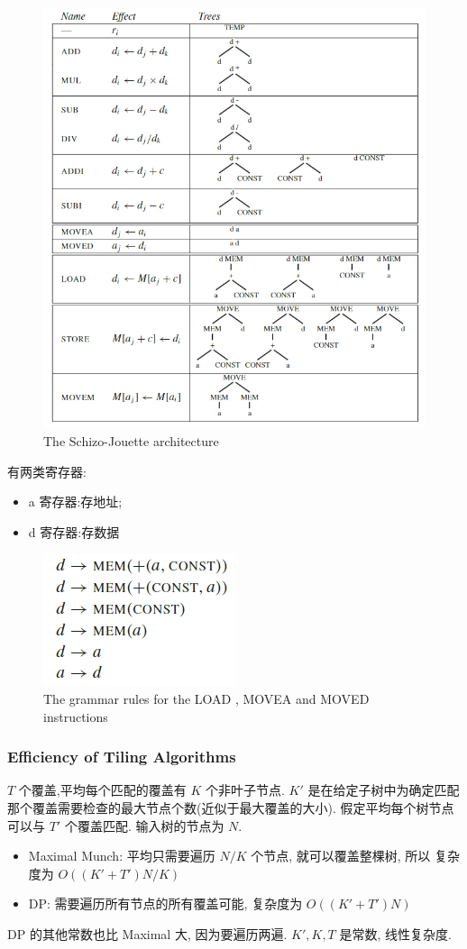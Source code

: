 \begin{figure}[H]
    \centering
    \includegraphics[width=0.94\linewidth]{pic/CP9/The Schizo-Jouette architecture}
    \caption{The Schizo-Jouette architecture}
\end{figure}


有两类寄存器:
\begin{itemize}
    \item a 寄存器:存地址;
    \item d 寄存器:存数据
\end{itemize}

\begin{figure}[H]
    \centering
    \includegraphics[width=0.32\linewidth]{pic/CP9/The grammar rules}
    \caption{The grammar rules for the LOAD , MOVEA and MOVED instructions}
\end{figure}


\subsubsection{Efficiency of Tiling Algorithms}
$T$ 个覆盖,平均每个匹配的覆盖有 $K$ 个非叶子节点. $K'$ 是在给定子树中为确定匹配那个覆盖需要检查的最大节点个数(近似于最大覆盖的大小). 假定平均每个树节点可以与 $T'$ 个覆盖匹配. 输入树的节点为 $N$.
\begin{itemize}
    \item Maximal Munch: 平均只需要遍历 $N/K$ 个节点, 就可以覆盖整棵树, 所以 复杂度为 $O((K'+T')N/K)$
    \item DP: 需要遍历所有节点的所有覆盖可能, 复杂度为 $O((K'+T')N)$
\end{itemize}
DP 的其他常数也比 Maximal 大, 因为要遍历两遍. $K',K,T$ 是常数, 线性复杂度.

